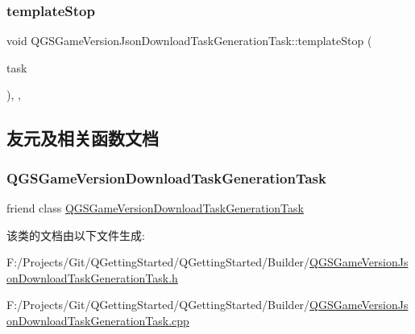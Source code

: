 \subsubsection{\texorpdfstring{template\+Stop}{templateStop}}
{\footnotesize\ttfamily void Q\+G\+S\+Game\+Version\+Json\+Download\+Task\+Generation\+Task\+::template\+Stop (\begin{DoxyParamCaption}\item[{\mbox{\hyperlink{class_q_g_s_task}{Q\+G\+S\+Task}} $\ast$}]{task }\end{DoxyParamCaption})\hspace{0.3cm}{\ttfamily [protected]}, {\ttfamily [virtual]}, {\ttfamily [slot]}}



\subsection{友元及相关函数文档}
\mbox{\label{class_q_g_s_game_version_json_download_task_generation_task_ac1ad33ecea9de4412662c804c9225001}} 
\subsubsection{\texorpdfstring{Q\+G\+S\+Game\+Version\+Download\+Task\+Generation\+Task}{QGSGameVersionDownloadTaskGenerationTask}}
{\footnotesize\ttfamily friend class \mbox{\hyperlink{class_q_g_s_game_version_download_task_generation_task}{Q\+G\+S\+Game\+Version\+Download\+Task\+Generation\+Task}}\hspace{0.3cm}{\ttfamily [friend]}}



该类的文档由以下文件生成\+:\begin{DoxyCompactItemize}
\item 
F\+:/\+Projects/\+Git/\+Q\+Getting\+Started/\+Q\+Getting\+Started/\+Builder/\mbox{\hyperlink{_q_g_s_game_version_json_download_task_generation_task_8h}{Q\+G\+S\+Game\+Version\+Json\+Download\+Task\+Generation\+Task.\+h}}\item 
F\+:/\+Projects/\+Git/\+Q\+Getting\+Started/\+Q\+Getting\+Started/\+Builder/\mbox{\hyperlink{_q_g_s_game_version_json_download_task_generation_task_8cpp}{Q\+G\+S\+Game\+Version\+Json\+Download\+Task\+Generation\+Task.\+cpp}}\end{DoxyCompactItemize}
